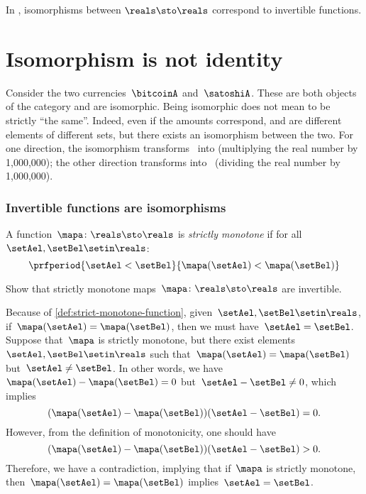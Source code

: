 \begin{example}
    In \Set, isomorphisms between $\reals\sto \reals$ correspond to invertible functions.
\end{example}

\section{Isomorphism is not identity}
\begin{example}
    Consider the two currencies~$\bitcoinA$ and~$\satoshiA$.
    These are both objects of the category \Curr and are isomorphic.
    Being isomorphic does not mean to be strictly ``the same''.
    Indeed, even if the amounts correspond, \unit[1]{\bitcoinA} and \unit[1,000,000]{\satoshiA} are different elements of different sets, but there exists an isomorphism between the two.
    For one direction, the isomorphism transforms \bitcoinA \ into \satoshiA (multiplying the real number by 1,000,000);
    the other direction transforms \satoshiA into \bitcoinA \ (dividing the real number by 1,000,000).
\end{example}

\subsubsection{Invertible functions are isomorphisms}
\begin{definition}
    \label{def:strict-monotone-function}
    A function~$\mapa\colon \reals \sto \reals$ is \emph{strictly monotone} if for all~$\setAel,\setBel\setin \reals$:
    \begin{equation}
        \prfperiod{\setAel < \setBel}{\mapa(\setAel)<\mapa(\setBel)}
    \end{equation}
\end{definition}
\begin{exercise}
    Show that strictly monotone maps~$\mapa\colon \reals \sto \reals$ are invertible.
\end{exercise}
\begin{solution}
    Because of \cref{def:strict-monotone-function}, given~$\setAel,\setBel\setin \reals$, if~$\mapa(\setAel)=\mapa(\setBel)$, then we must have~$\setAel=\setBel$.
    Suppose that~$\mapa$ is strictly monotone, but there exist elements~$\setAel,\setBel\setin \reals$ such that~$\mapa(\setAel)=\mapa(\setBel)$ but~$\setAel\neq \setBel$.
    In other words, we have~$\mapa(\setAel)-\mapa(\setBel)=0$ but~$\setAel-\setBel\neq 0$, which implies
    \begin{equation}
        (\mapa(\setAel)-\mapa(\setBel))(\setAel-\setBel)=0.
    \end{equation}
    However, from the definition of monotonicity, one should have
    \begin{equation}
        (\mapa(\setAel)-\mapa(\setBel))(\setAel-\setBel)>0.
    \end{equation}
    Therefore, we have a contradiction, implying that if~$\mapa$ is strictly monotone, then~$\mapa(\setAel)=\mapa(\setBel)$ implies~$\setAel=\setBel$.
\end{solution}

